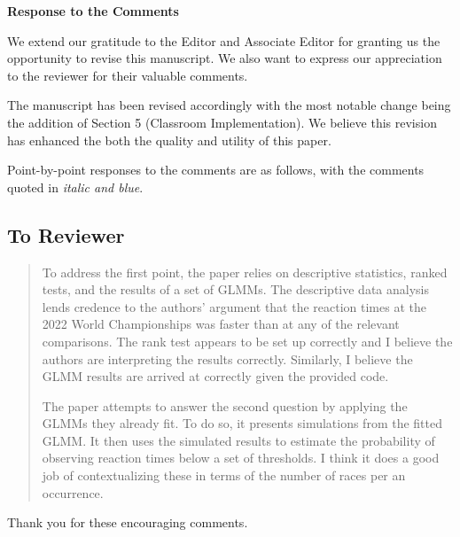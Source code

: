 \documentclass[12pt]{article}
\newenvironment{comment}%
{\begin{quotation}\noindent\small\it\color{darkblue}\ignorespaces%
}{\end{quotation}}
\begin{document}
\begin{center}
  {\Large\bf Response to the Comments}
\end{center}

We extend our gratitude to the Editor and Associate Editor for 
granting us the opportunity to revise this manuscript. We also want to
express our appreciation to the reviewer for their valuable comments. 


The manuscript has been revised accordingly with the most notable change being 
the addition of Section 5 (Classroom Implementation). We believe this revision 
has enhanced the both the quality and utility of this paper.


Point-by-point responses to the comments are as follows, with the
comments quoted in \emph{\color{darkblue} italic and blue}.


\subsection*{To Reviewer}


\begin{comment}
To address the first point, the paper relies on descriptive statistics, ranked
tests, and the results of a set of GLMMs. The descriptive data analysis lends
credence to the authors' argument that the reaction times at the 2022 World
Championships was faster than at any of the relevant comparisons. The rank test
appears to be set up correctly and I believe the authors are interpreting the
results correctly. Similarly, I believe the GLMM results are arrived at
correctly given the provided code.

The paper attempts to answer the second question by applying the GLMMs they
already fit. To do so, it presents simulations from the fitted GLMM. It then
uses the simulated results to estimate the probability of observing reaction
times below a set of thresholds. I think it does a good job of contextualizing
these in terms of the number of races per an occurrence.
\end{comment}


Thank you for these encouraging comments.  
\end{document}
